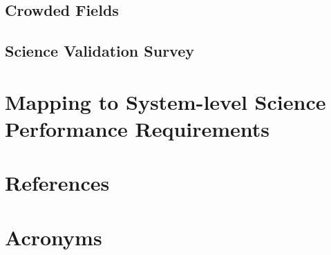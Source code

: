 \documentclass[SE,authoryear,toc]{lsstdoc}
\begin{document}
\subsection{Crowded Fields}

\subsection{Science Validation Survey}

\section{Mapping to System-level Science Performance Requirements}

\appendix
\section{References} \label{sec:bib}
\renewcommand{\refname}{} %


\section{Acronyms} \label{sec:acronyms}

\end{document}
